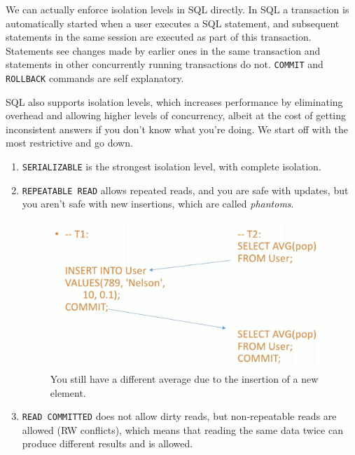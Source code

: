 \documentclass{article}
\begin{document}
      We can actually enforce isolation levels in SQL directly. In SQL a transaction is automatically started when a user executes a SQL statement, and subsequent statements in the same session are executed as part of this transaction. Statements see changes made by earlier ones in the same transaction and statements in other concurrently running transactions do not. \texttt{COMMIT} and \texttt{ROLLBACK} commands are self explanatory.  
       
      SQL also supports isolation levels, which increases performance by eliminating overhead and allowing higher levels of concurrency, albeit at the cost of getting inconsistent answers if you don't know what you're doing. We start off with the most restrictive and go down. 
      \begin{enumerate}
        \item \texttt{SERIALIZABLE} is the strongest isolation level, with complete isolation. 

        \item \texttt{REPEATABLE READ} allows repeated reads, and you are safe with updates, but you aren't safe with new insertions, which are called \textit{phantoms}. 

        \begin{figure}[H]
          \centering 
          \includegraphics[scale=0.4]{img/rep_read.png}
          \caption{You still have a different average due to the insertion of a new element. } 
          \label{fig:rep_read}
        \end{figure}

        \item \texttt{READ COMMITTED} does not allow dirty reads, but non-repeatable reads are allowed (RW conflicts), which means that reading the same data twice can produce different results and is allowed. 


\end{enumerate}
\end{document}
